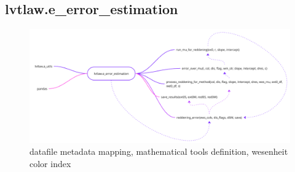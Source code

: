 \documentclass{article}
\begin{document}
\newpage
\subsection{lvtlaw.e\_error\_estimation}

\begin{figure}[h!]
\caption{\small datafile metadata mapping, mathematical tools definition, wesenheit color index}
\includegraphics[width=\textwidth]{./figures/e_error_estimation.png}
\end{figure}
\end{document}
